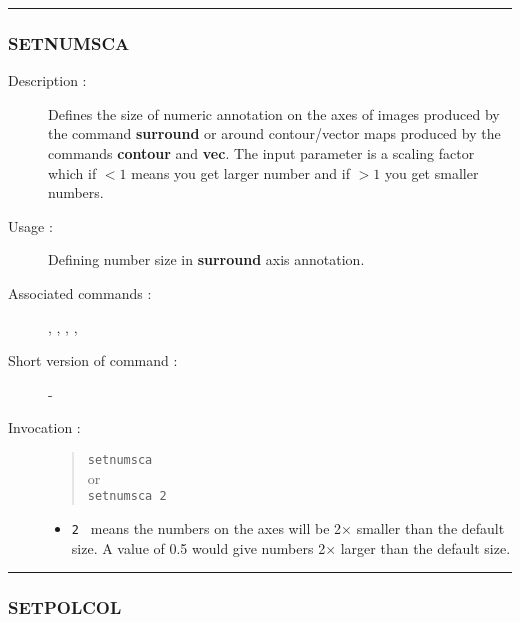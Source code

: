 \hrule
\subsubsection*{\label{SETNUMSCA}SETNUMSCA}

\begin{description}

\item[Description :] Defines the size of numeric annotation on the axes
of images produced by the command {\bf surround} or around
contour/vector maps produced by the commands {\bf contour} and {\bf
vec}.  The input parameter is a scaling factor which if $<1$ means you
get larger number and if $>1$ you get smaller numbers.

\item[Usage :] Defining number size in {\bf surround} axis annotation.

\item[Associated commands :] {\tt {}},
{\tt {}}, {\tt {}},
{\tt {}}, {\tt {}}

\item[Short version of command :] -
\item[Invocation :]

\begin{quote}{\tt  setnumsca }\\
or \\
{\tt setnumsca 2 }
\end{quote}

\begin{itemize}

\item {\tt 2 } means the numbers on the axes will be 2$\times$ smaller
than the default size. A value of 0.5 would give numbers 2$\times$
larger than the default size.

\end{itemize}

\end{description}

\hrule
\subsubsection*{\label{SETPOLCOL}SETPOLCOL}

